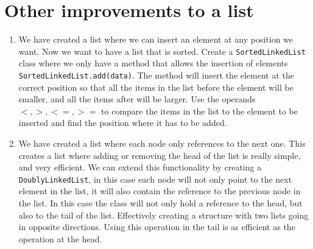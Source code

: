 \documentclass[10pt,a4paper]{article}
\begin{document}
\FloatBarrier

\newpage

\section*{Other improvements to a list}

\begin{enumerate}
	\item We have created a list where we can insert an element at any position we want. Now we want to have a list that is sorted. Create a \texttt{SortedLinkedList} class where we only have a method that allows the insertion of elements \texttt{SortedLinkedList.add(data)}. The method will insert the element at the correct position so that all the items in the list before the element will be smaller, and all the items after will be larger. Use the operands $<, >, <=, >=$ to compare the items in the list to the element to be inserted and find the position where it has to be added.
	\item We have created a list where each node only references to the next one. This creates a list where adding or removing the head of the list is really simple, and very efficient. We can extend this functionality by creating a \texttt{DoublyLinkedList}, in this case each node will not only point to the next element in the list, it will also contain the reference to the previous node in the list. In this case the class will not only hold a reference to the head, but also to the tail of the list. Effectively creating a structure with two lists going in opposite directions. Using this operation in the tail is as efficient as the operation at the head.
    \begin{figure}[h!bt]
	\begin{center}
	\end{center}
    \end{figure}
\end{enumerate}
\end{document}
